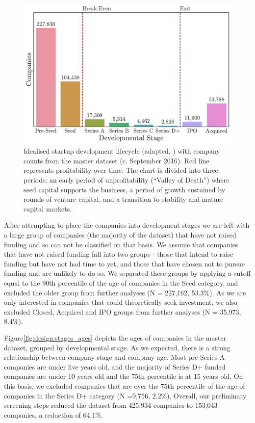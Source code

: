 \documentclass[../thesis/thesis.tex]{subfiles}
\begin{document}
\begin{figure}[!htb]
    \centering
    \includegraphics[width=\textwidth]{../figures/design/lifecycle}
    \caption{Idealised startup development lifecycle (adapted, \cite{}) with company counts from the master dataset (c. September 2016). Red line represents profitability over time. The chart is divided into three periods: an early period of unprofitability (``Valley of Death'') where seed capital supports the business, a period of growth sustained by rounds of venture capital, and a transition to stability and mature capital markets.}
    \label{fig:design:lifecycle}
\end{figure}


After attempting to place the companies into development stages we are left with a large group of companies (the majority of the dataset) that have not raised funding and so can not be classified on that basis. We assume that companies that have not raised funding fall into two groups - those that intend to raise funding but have not had time to yet, and those that have chosen not to pursue funding and are unlikely to do so. We separated these groups by applying a cutoff equal to the 90th percentile of the age of companies in the Seed category, and excluded the older group from further analyses (N = 227,162,  53.3\%). As we are only interested in companies that could theoretically seek investment, we also excluded Closed, Acquired and IPO groups from further analyses (N = 35,973, 8.4\%).

Figure\ref{fig:design:stages_ages} depicts the ages of companies in the master dataset, grouped by developmental stage.  As we expected, there is a strong relationship between company stage and company age. Most pre-Series A companies are under five years old, and the majority of Series D+ funded companies are under 10 years old and the 75th percentile is at 15 years old. On this basis, we excluded companies that are over the 75th percentile of the age of companies in the Series D+ category (N =9,756, 2.2\%). Overall, our preliminary screening steps reduced the dataset from 425,934 companies to 153,043 companies, a reduction of 64.1\%.
\end{document}
